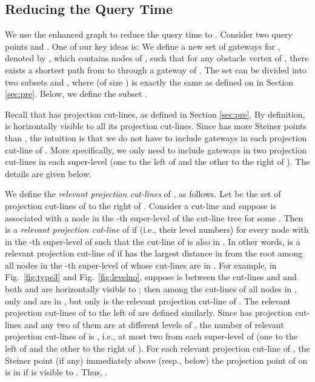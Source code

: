 \documentclass[english,runningheads,11pt]{llncs}
\begin{document}
\subsection{Reducing the Query Time}

We use the enhanced graph  to reduce the query time to .
Consider two query points  and . One of our key ideas is: We
define a new set of gateways for , denoted by , which
contains  nodes of , such that
for any obstacle vertex  of , there
exists a shortest path from  to  through a gateway of
. The set  can be divided into two subsets  and
, where  (of size ) is exactly the same as
 defined on  in Section \ref{sec:pre}. Below,
we define the subset .

Recall that  has  projection cut-lines, as defined in
Section \ref{sec:pre}. By definition,  is horizontally visible to all its
projection cut-lines. Since  has more Steiner points than , the intuition is that we do not have to include gateways in each projection cut-line of . More specifically, we only need to include gateways in two projection cut-lines in each super-level (one to the left of  and the other to the right of ). The details are given below.

 We define the {\em relevant projection
cut-lines} of , as follows. Let  be the set of projection cut-lines of
 to the right of .  Consider a cut-line 
and suppose  is associated with a node  in the -th super-level
of the cut-line tree  for some . Then  is a {\em relevant
projection cut-line} of  if  (i.e., their level
numbers) for every node  with  in the
-th super-level of 
such that the cut-line  of  is also in . In other words,
 is a relevant projection cut-line of  if  has the largest distance
in  from the root
among all nodes  in the -th super-level of  whose
cut-lines  are in . For example, in Fig.~\ref{fig:type3} and Fig.~\ref{fig:levelno}, suppose  is between the cut-lines  and  and both  and  are horizontally visible to ; then among the cut-lines of all nodes in , only  and  are in , but only  is the relevant projection cut-line of .  The relevant projection cut-lines
of  to the left of  are defined similarly.  Since  has  projection cut-lines and any two of them are at different levels
of , the number of relevant projection cut-lines of  is
, i.e., at most two from each super-level of
 (one to the left of  and the other to the right of ). For each relevant projection cut-line  of , the Steiner point 
(if any) immediately above (resp., below) the projection point  of  on  is in
 if  is visible to . Thus,
.
\end{document}
